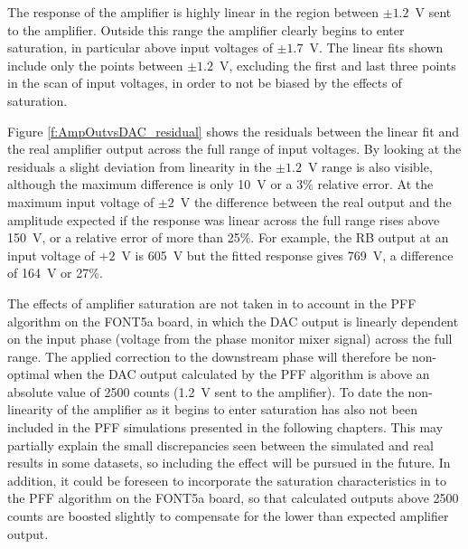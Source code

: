The response of the amplifier is highly linear in the region between \(\pm1.2\)~V sent to the amplifier. Outside this range the amplifier clearly begins to enter saturation, in particular above input voltages of \(\pm1.7\)~V. The linear fits shown include only the points between \(\pm1.2\)~V, excluding the first and last three points in the scan of input voltages, in order to not be biased by the effects of saturation.

Figure \ref{f:AmpOutvsDAC_residual} shows the residuals between the linear fit and the real amplifier output across the full range of input voltages. By looking at the residuals a slight deviation from linearity in the \(\pm1.2\)~V range is also visible, although the maximum difference is only 10~V or a 3\% relative error. At the maximum input voltage of \(\pm2\)~V the difference between the real output and the amplitude expected if the response was linear across the full range rises above 150~V, or a relative error of more than 25\%. For example, the RB output at an input voltage of \(+2\)~V is 605~V but the fitted response gives 769~V, a difference of 164~V or 27\%.

The effects of amplifier saturation are not taken in to account in the PFF algorithm on the FONT5a board, in which the DAC output is linearly dependent on the input phase (voltage from the phase monitor mixer signal) across the full range. The applied correction to the downstream phase will therefore be non-optimal when the DAC output calculated by the PFF algorithm is above an absolute value of 2500 counts (1.2~V sent to the amplifier). To date the non-linearity of the amplifier as it begins to enter saturation has also not been included in the PFF simulations presented in the following chapters. This may partially explain the small discrepancies seen between the simulated and real results in some datasets, so including the effect will be pursued in the future. In addition, it could be foreseen to incorporate the saturation characteristics in to the PFF algorithm on the FONT5a board, so that calculated outputs above 2500 counts are boosted slightly to compensate for the lower than expected amplifier output.

